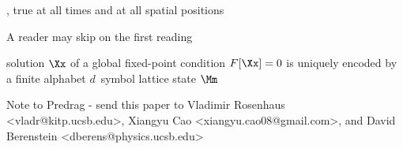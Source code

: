 \begin{description}
{, true at all times and at all spatial positions

A reader may skip  on the
first reading

solution $\Xx$ of a global fixed-point condition
$F[\Xx]=0$ is uniquely encoded by a finite alphabet $d$\dmn\ symbol
lattice state  $\Mm$

    }


\end{description}





%    
\bigskip\bigskip

\noindent
Note to Predrag - send this paper to
Vladimir Rosenhaus  <vladr@kitp.ucsb.edu>,
Xiangyu Cao <xiangyu.cao08@gmail.com>,
and
David Berenstein <dberens@physics.ucsb.edu>
